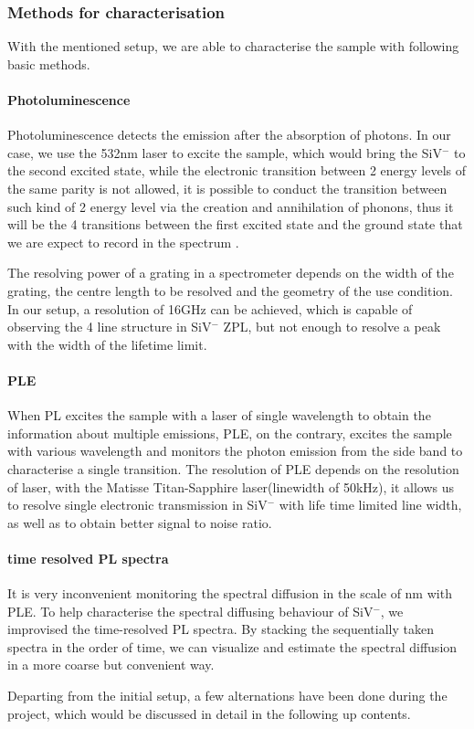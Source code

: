 \subsubsection{Methods for characterisation} 
With the mentioned setup, we are able to characterise the sample with following basic methods.


\paragraph{Photoluminescence} 
Photoluminescence detects the emission after the absorption of photons. In our case, we use the 532nm laser to excite the sample, which would bring the SiV$^{-}$ to the second excited state, while the electronic transition between 2 energy levels of the same parity is not allowed, it is possible to conduct the transition between such kind of 2 energy level via the creation and annihilation of phonons, thus it will be the 4 transitions between the first excited state and the ground state that we are expect to record in the spectrum .

The resolving power of a grating in a spectrometer depends on the width of the grating, the centre length to be resolved and the geometry of the use condition. In our setup, a resolution of 16GHz can be achieved, which is capable of observing the 4 line structure in SiV$^{-}$ ZPL, but not enough to resolve a peak with the width of the lifetime limit. 

\paragraph{PLE} When PL excites the sample with a laser of single wavelength to obtain the information about multiple emissions, PLE, on the contrary, excites the sample with various wavelength and monitors the photon emission from the side band to characterise a single transition. The resolution of PLE depends on the resolution of laser, with the Matisse Titan-Sapphire laser(linewidth of 50kHz), it allows us to resolve single electronic transmission in SiV$^{-}$ with life time limited line width, as well as to obtain better signal to noise ratio. 

\paragraph{time resolved PL spectra} It is very inconvenient monitoring the spectral diffusion in the scale of nm with PLE. To help characterise the spectral diffusing behaviour of SiV$^{-}$, we improvised the time-resolved PL spectra. By stacking the sequentially taken spectra in the order of time, we can visualize and estimate the spectral diffusion in a more coarse but convenient way. 
 
Departing from the initial setup, a few alternations have been done during the project, which would be discussed in detail in the following up contents.